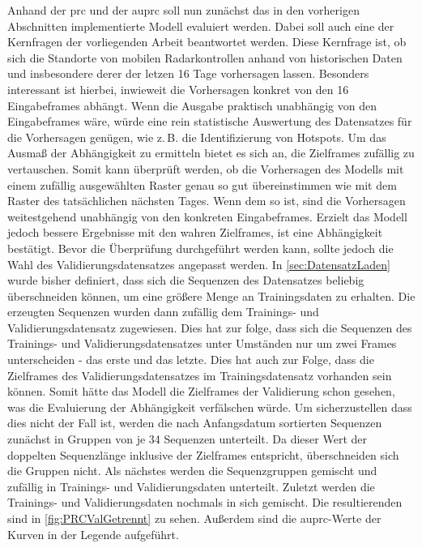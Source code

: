 Anhand der \acrshort{prc} und der \acrshort{auprc} soll nun zunächst das in den vorherigen Abschnitten implementierte Modell evaluiert werden.
Dabei soll auch eine der Kernfragen der vorliegenden Arbeit beantwortet werden.
Diese Kernfrage ist, ob sich die Standorte von mobilen Radarkontrollen anhand von historischen Daten und insbesondere derer der letzen 16 Tage vorhersagen lassen.
Besonders interessant ist hierbei, inwieweit die Vorhersagen konkret von den 16 Eingabeframes abhängt.
Wenn die Ausgabe praktisch unabhängig von den Eingabeframes wäre, würde eine rein statistische Auswertung des Datensatzes für die Vorhersagen genügen, wie z.\,B. die Identifizierung von Hotspots.
Um das Ausmaß der Abhängigkeit zu ermitteln bietet es sich an, die Zielframes zufällig zu vertauschen.
Somit kann überprüft werden, ob die Vorhersagen des Modells mit einem zufällig ausgewählten Raster genau so gut übereinstimmen wie mit dem Raster des tatsächlichen nächsten Tages.
Wenn dem so ist, sind die Vorhersagen weitestgehend unabhängig von den konkreten Eingabeframes.
Erzielt das Modell jedoch bessere Ergebnisse mit den wahren Zielframes, ist eine Abhängigkeit bestätigt.
Bevor die Überprüfung durchgeführt werden kann, sollte jedoch die Wahl des Validierungsdatensatzes angepasst werden.
In \autoref{sec:DatensatzLaden} wurde bisher definiert, dass sich die Sequenzen des Datensatzes beliebig überschneiden können, um eine größere Menge an Trainingsdaten zu erhalten.
Die erzeugten Sequenzen wurden dann zufällig dem Trainings- und Validierungsdatensatz zugewiesen.
Dies hat zur folge, dass sich die Sequenzen des Trainings- und Validierungsdatensatzes unter Umständen nur um zwei Frames unterscheiden - das erste und das letzte.
Dies hat auch zur Folge, dass die Zielframes des Validierungsdatensatzes im Trainingsdatensatz vorhanden sein können.
Somit hätte das Modell die Zielframes der Validierung schon gesehen, was die Evaluierung der Abhängigkeit verfälschen würde.
Um sicherzustellen dass dies nicht der Fall ist, werden die nach Anfangsdatum sortierten Sequenzen zunächst in Gruppen von je 34 Sequenzen unterteilt.
Da dieser Wert der doppelten Sequenzlänge inklusive der Zielframes entspricht, überschneiden sich die Gruppen nicht.
Als nächstes werden die Sequenzgruppen gemischt und zufällig in Trainings- und Validierungsdaten unterteilt.
Zuletzt werden die Trainings- und Validierungsdaten nochmals in sich gemischt.
Die resultierenden  sind in \autoref{fig:PRCValGetrennt} zu sehen.
Außerdem sind die \acrshort{auprc}-Werte der Kurven in der Legende aufgeführt.

